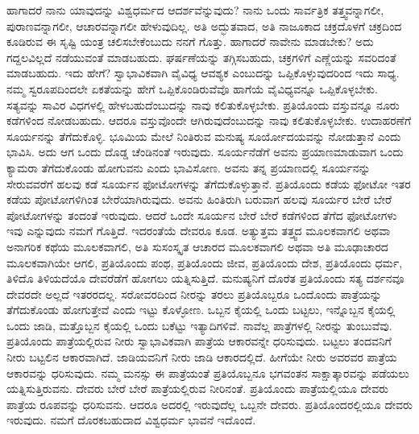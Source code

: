ಹಾಗಾದರೆ ನಾನು ಯಾವುದನ್ನು ವಿಶ್ವಧರ್ಮದ ಆದರ್ಶವೆನ್ನುವುದು? ನಾನು ಒಂದು ಸಾರ್ವತ್ರಿಕ ತತ್ತ್ವವನ್ನಾಗಲೀ, ಪುರಾಣವನ್ನಾಗಲೀ, ಆಚಾರವನ್ನಾಗಲೀ ಹೇಳುವುದಿಲ್ಲ. ಅತಿ ಅದ್ಭುತವಾದ, ಅತಿ ನಾಜೂಕಾದ ಚಕ್ರದೊಳಗೆ ಚಕ್ರದಿಂದ ಕೂಡಿರುವ ಈ ಸೃಷ್ಟಿ ಯಂತ್ರ ಚಲಿಸಬೇಕೆಂಬುದು ನನಗೆ ಗೊತ್ತು. ಹಾಗಾದರೆ ನಾವೇನು ಮಾಡಬೇಕು? ಅದು ಗದ್ದಲವಿಲ್ಲದೆ ನಡೆಯುವಂತೆ ಮಾಡಬಹುದು. ಘರ್ಷಣೆಯನ್ನು ತಗ್ಗಿಸಬಹುದು, ಚಕ್ರಗಳಿಗೆ ಎಣ್ಣೆಯನ್ನು ಸವರಿದಂತೆ ಮಾಡಬಹುದು. ಇದು ಹೇಗೆ? ಸ್ವಾಭಾವಿಕವಾಗಿ ವೈವಿಧ್ಯ ಆವಶ್ಯಕ ಎಂಬುದನ್ನು ಒಪ್ಪಿಕೊಳ್ಳುವುದರಿಂದ ಇದು ಸಾಧ್ಯ. ನಮ್ಮ ಸ್ವರೂಪದಿಂದಲೇ ಏಕತೆಯನ್ನು ಹೇಗೆ ಒಪ್ಪಿಕೊಂಡಿರುವೆವೊ ಹಾಗೆಯೆ ವೈವಿಧ್ಯವನ್ನೂ ಒಪ್ಪಿಕೊಳ್ಳಬೇಕು. ಸತ್ಯವನ್ನು ಸಾವಿರ ವಿಧಗಳಲ್ಲಿ ಹೇಳಬಹುದೆಂಬುದನ್ನು ನಾವು ಕಲಿತುಕೊಳ್ಳಬೇಕು. ಪ್ರತಿಯೊಂದು ವಸ್ತುವನ್ನೂ ನೂರು ಕಡೆಗಳಿಂದ ನೋಡಬಹುದು. ಆದರೂ ವಸ್ತುವೊಂದೇ ಆಗಿರುವುದೆಂಬುದನ್ನು ನಾವು ಕಲಿತುಕೊಳ್ಳಬೇಕು. ಉದಾಹರಣೆಗೆ ಸೂರ್ಯನನ್ನು ತೆಗೆದುಕೊಳ್ಳಿ. ಭೂಮಿಯ ಮೇಲೆ ನಿಂತಿರುವ ಮನುಷ್ಯ ಸೂರ್ಯೋದಯವನ್ನು ನೋಡುತ್ತಾನೆ ಎಂದು ಭಾವಿಸಿ. ಅದು ಆಗ ಒಂದು ದೊಡ್ಡ ಚೆಂಡಿನಂತೆ ಇರುವುದು. ಸೂರ್ಯನೆಡೆಗೆ ಅವನು ಪ್ರಯಾಣಮಾಡುವಾಗ ಒಂದು ಕ್ಯಾಮರಾ ತೆಗೆದುಕೊಂಡು ಹೋಗುವನು ಎಂದು ಭಾವಿಸೋಣ. ಅವನು ತನ್ನ ಪ್ರಯಾಣದಲ್ಲಿ ಸೂರ್ಯನನ್ನು ಸೇರುವವರೆಗೆ ಹಲವು ಕಡೆ ಸೂರ್ಯನ ಫೋಟೋಗಳನ್ನು ತೆಗೆದುಕೊಳ್ಳುತ್ತಾನೆ. ಪ್ರತಿಯೊಂದು ಕಡೆಯ ಫೋಟೋ ಇತರ ಕಡೆಯ ಪೋಟೋಗಳಿಗಿಂತ ಬೇರೆಯಾಗಿರುವುದು. ಅವನು ಹಿಂತಿರುಗಿ ಬರುವಾಗ ಹಲವು ಸೂರ್ಯರ ಬೇರೆ ಬೇರೆ ಪೋಟೋಗಳನ್ನು ತಂದಂತೆ ಇರುವುದು. ಆದರೆ ಒಂದೇ ಸೂರ್ಯನ ಬೇರೆ ಬೇರೆ ಕಡೆಗಳಿಂದ ತೆಗೆದ ಫೋಟೋಗಳು ಇವು ಎನ್ನುವುದು ನಮಗೆ ಗೊತ್ತಿದೆ. ಇದರಂತೆಯೆ ದೇವರೂ ಕೂಡ. ಅತ್ಯುತ್ತಮ ತತ್ತ್ವದ ಮೂಲಕವಾಗಲಿ ಅಥವಾ ಅನಾಗರಿಕ ಕಥೆಯ ಮೂಲಕವಾಗಲಿ, ಅತಿ ಸುಸಂಸ್ಕೃತ ಆಚಾರದ ಮೂಲಕವಾಗಲಿ ಅಥವಾ ಅತಿ ಮೂಢಾಚಾರದ ಮೂಲಕವಾಗಿಯೇ ಆಗಲಿ, ಪ್ರತಿಯೊಂದು ಪಂಥ, ಪ್ರತಿಯೊಂದು ಜೀವ, ಪ್ರತಿಯೊಂದು ದೇಶ, ಪ್ರತಿಯೊಂದು ಧರ್ಮ, ತಿಳಿದೊ ತಿಳಿಯದೆಯೊ ದೇವರೆಡೆಗೆ ಹೋಗಲು ಯತ್ನಿಸುತ್ತಿದೆ. ಮನುಷ್ಯನಿಗೆ ದೊರೆತ ಪ್ರತಿಯೊಂದು ಸತ್ಯ ದರ್ಶನವೂ ದೇವರದೇ ಅಲ್ಲದೆ ಇತರರದಲ್ಲ. ಸರೋವರದಿಂದ ನೀರನ್ನು ತರಲು ಪ್ರತಿಯೊಬ್ಬರೂ ಒಂದೊಂದು ಪಾತ್ರೆಯನ್ನು ತೆಗೆದುಕೊಂಡು ಹೋಗುತ್ತೇವೆ ಎಂದು ಇಟ್ಟು ಕೊಳ್ಳೋಣ. ಒಬ್ಬನ ಕೈಯಲ್ಲಿ ಒಂದು ಬಟ್ಟಲು, ಇನ್ನೊಬ್ಬನ ಕೈಯಲ್ಲಿ ಒಂದು ಜಾಡಿ, ಮತ್ತೊಬ್ಬನ ಕೈಯಲ್ಲಿ ಒಂದು ಬಕೆಟ್ಟು ಇತ್ಯಾದಿಗಳಿವೆ. ನಾವೆಲ್ಲ ಪಾತ್ರೆಗಳಲ್ಲಿ ನೀರನ್ನು ತುಂಬುವೆವು. ಪ್ರತಿಯೊಂದು ಪಾತ್ರೆಯಲ್ಲಿರುವ ನೀರು ಸ್ವಾಭಾವಿಕವಾಗಿ ಪಾತ್ರೆಯ ಆಕಾರವನ್ನೇ ಧರಿಸುವುದು. ಬಟ್ಟಲು ತಂದವನಿಗೆ ನೀರು ಬಟ್ಟಲಿನ ಆಕಾರವಾಗಿದೆ. ಜಾಡಿಯವನಿಗೆ ನೀರು ಜಾಡಿ ಆಕಾರದಲ್ಲಿದೆ. ಹೀಗೆಯೇ ನೀರು ಅವರವರ ಪಾತ್ರೆಯ ಆಕಾರವನ್ನು ಧರಿಸುವುದು. ನಮ್ಮ ಮನಸ್ಸು ಈ ಪಾತ್ರೆಯಂತೆ ಪ್ರತಿಯೊಬ್ಬನೂ ಭಗವಂತನ ಸಾಕ್ಷಾತ್ಕಾರವನ್ನು ಪಡೆಯಲು ಯತ್ನಿಸುತ್ತಿರುವನು. ದೇವರು ಬೇರೆ ಬೇರೆ ಪಾತ್ರೆಯಲ್ಲಿರುವ ನೀರಿನಂತೆ. ಪ್ರತಿಯೊಂದು ಪಾತ್ರೆಯಲ್ಲಿಯೂ ದೇವರು ಪಾತ್ರೆಯ ರೂಪವನ್ನು ಧರಿಸುವನು. ಆದರೂ ಅದರಲ್ಲಿ ಇರುವುದೆಲ್ಲ ಒಬ್ಬನೇ ದೇವರು. ಪ್ರತಿಯೊಂದರಲ್ಲಿಯೂ ದೇವರು ಇರುವುದು. ನಮಗೆ ದೊರಕಬಹುದಾದ ವಿಶ್ವಧರ್ಮ ಭಾವನೆ ಇದೊಂದೆ.


